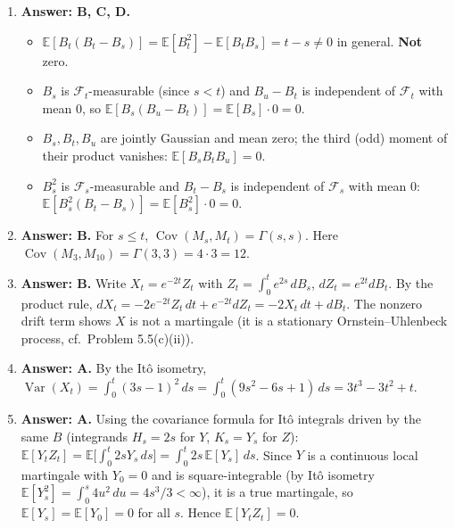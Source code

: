 \documentclass[11pt]{article}
\newcommand{\E}{\mathbb{E}}
\DeclareMathOperator{\Var}{Var}
\DeclareMathOperator{\Cov}{Cov}
\newcommand{\ans}[1]{\par\noindent\textbf{\color{blue!50!black}Answer: #1}}
\begin{document}
\begin{enumerate}
\item[\textbf{Q12.}] \ans{B, C, D.}
\begin{itemize}[nosep]
\item[A] $\E[B_t(B_t-B_s)]=\E[B_t^2]-\E[B_tB_s]=t-s\ne0$ in general. \textbf{Not} zero.
\item[B] $B_s$ is $\mathcal F_t$-measurable (since $s<t$) and $B_u-B_t$ is independent of $\mathcal F_t$ with mean $0$, so $\E[B_s(B_u-B_t)]=\E[B_s]\cdot0=0$.
\item[C] $B_s,B_t,B_u$ are jointly Gaussian and mean zero; the third (odd) moment of their product vanishes: $\E[B_sB_tB_u]=0$.
\item[D] $B_s^2$ is $\mathcal F_s$-measurable and $B_t-B_s$ is independent of $\mathcal F_s$ with mean $0$: $\E[B_s^2(B_t-B_s)]=\E[B_s^2]\cdot0=0$.
\end{itemize}

\item[\textbf{Q13.}] \ans{B.} For $s\le t$, $\Cov(M_s,M_t)=\Gamma(s,s)$. Here $\Cov(M_3,M_{10})=\Gamma(3,3)=4\cdot3=12$.

\item[\textbf{Q14.}] \ans{B.} Write $X_t=e^{-2t}Z_t$ with $Z_t=\int_0^te^{2s}\,dB_s$, $dZ_t=e^{2t}dB_t$. By the product rule, $dX_t=-2e^{-2t}Z_t\,dt+e^{-2t}dZ_t=-2X_t\,dt+dB_t$. The nonzero drift term shows $X$ is not a martingale (it is a stationary Ornstein--Uhlenbeck process, cf.\ Problem 5.5(c)(ii)).

\item[\textbf{Q15.}] \ans{A.} By the Itô isometry, $\Var(X_t)=\int_0^t(3s-1)^2\,ds=\int_0^t(9s^2-6s+1)\,ds=3t^3-3t^2+t$.

\item[\textbf{Q16.}] \ans{A.} Using the covariance formula for Itô integrals driven by the same $B$ (integrands $H_s=2s$ for $Y$, $K_s=Y_s$ for $Z$): $\E[Y_tZ_t]=\E\Big[\int_0^t2sY_s\,ds\Big]=\int_0^t2s\,\E[Y_s]\,ds$. Since $Y$ is a continuous local martingale with $Y_0=0$ and is square-integrable (by Itô isometry $\E[Y_s^2]=\int_0^s4u^2\,du=4s^3/3<\infty$), it is a true martingale, so $\E[Y_s]=\E[Y_0]=0$ for all $s$. Hence $\E[Y_tZ_t]=0$.

\end{enumerate}
\end{document}
